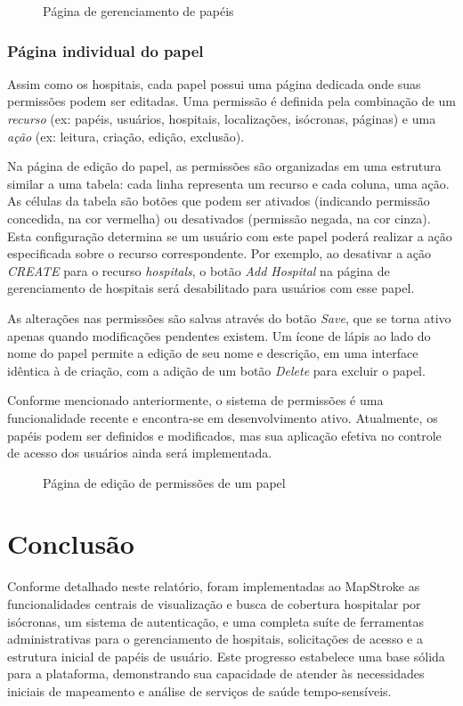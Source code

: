 \documentclass{article}
\newcommand{\image}[2]{
    \begin{figure}[H]
        \fcolorbox{light-gray}{white}{\texttt{[image: \#1]}}
        \caption{#2}
    \end{figure}
}
\begin{document}
\image{09.png}{Página de gerenciamento de papéis}

\subsubsection{Página individual do papel}

Assim como os hospitais, cada papel possui uma página dedicada onde suas permissões podem ser editadas. Uma permissão é definida pela combinação de um \textit{recurso} (ex: papéis, usuários, hospitais, localizações, isócronas, páginas) e uma \textit{ação} (ex: leitura, criação, edição, exclusão).

Na página de edição do papel, as permissões são organizadas em uma estrutura similar a uma tabela: cada linha representa um recurso e cada coluna, uma ação. As células da tabela são botões que podem ser ativados (indicando permissão concedida, na cor vermelha) ou desativados (permissão negada, na cor cinza). Esta configuração determina se um usuário com este papel poderá realizar a ação especificada sobre o recurso correspondente. Por exemplo, ao desativar a ação \textit{CREATE} para o recurso \textit{hospitals}, o botão \textit{Add Hospital} na página de gerenciamento de hospitais será desabilitado para usuários com esse papel.

As alterações nas permissões são salvas através do botão \textit{Save}, que se torna ativo apenas quando modificações pendentes existem. Um ícone de lápis ao lado do nome do papel permite a edição de seu nome e descrição, em uma interface idêntica à de criação, com a adição de um botão \textit{Delete} para excluir o papel.

Conforme mencionado anteriormente, o sistema de permissões é uma funcionalidade recente e encontra-se em desenvolvimento ativo. Atualmente, os papéis podem ser definidos e modificados, mas sua aplicação efetiva no controle de acesso dos usuários ainda será implementada.

\image{10.png}{Página de edição de permissões de um papel}

\section{Conclusão}

Conforme detalhado neste relatório, foram implementadas ao MapStroke as funcionalidades centrais de visualização e busca de cobertura hospitalar por isócronas, um sistema de autenticação, e uma completa suíte de ferramentas administrativas para o gerenciamento de hospitais, solicitações de acesso e a estrutura inicial de papéis de usuário. Este progresso estabelece uma base sólida para a plataforma, demonstrando sua capacidade de atender às necessidades iniciais de mapeamento e análise de serviços de saúde tempo-sensíveis.
\end{document}
